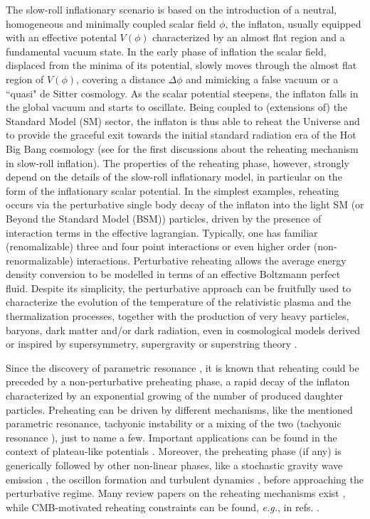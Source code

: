 \documentclass[%
aps,prd,nofootinbib,showkeys,a4paper,10pt
]{revtex4-2}
\begin{document}
The slow-roll inflationary scenario \cite{1,2,3,4,5,6} is based on the introduction of a neutral, homogeneous and minimally coupled scalar field $\phi$,
the inflaton, usually equipped with an effective potental $V(\phi)$ characterized by an almost flat region and a fundamental vacuum state.
In the early phase of inflation 
the scalar field, displaced from the minima of its potential, 
slowly moves through the almost flat region of $V(\phi)$, covering a distance $\Delta\phi$ \cite{7} and mimicking a false vacuum or a ``quasi" de Sitter cosmology. 
As the scalar potential steepens, the inflaton falls in the global vacuum and starts to oscillate.
Being coupled to (extensions of) the Standard Model (SM) sector,  the inflaton is thus able to reheat the Universe
and to provide the graceful exit towards the initial standard radiation era of the Hot Big Bang cosmology 
(see \cite{8,9,10,11} for the first discussions about the reheating mechanism in slow-roll inflation). 
The properties of the reheating phase, however, strongly depend on the details of the slow-roll inflationary model, in particular on the form of the inflationary scalar potential. 
In the simplest examples, reheating occurs via the  
perturbative single body decay of the inflaton into the light SM (or Beyond the Standard Model (BSM)) particles, 
driven by the presence of interaction terms in the effective lagrangian. Typically, one has  familiar (renomalizable) three and four point interactions
or even higher order (non-renormalizable) interactions.  
Perturbative reheating allows the average energy density conversion to be modelled in terms of an effective Boltzmann perfect fluid.  
Despite its simplicity, the perturbative approach can be fruitfully used to characterize the evolution of the temperature of the relativistic plasma 
and the thermalization processes, together with the production of very heavy
particles, baryons, dark matter and/or dark radiation, 
even in cosmological models derived or inspired  by supersymmetry, supergravity or superstring theory \cite{12,13,14,15,16,17,18,19,20,21,22,23,24,25,26,27,28,29}.

Since the discovery of parametric resonance \cite{30,31,32,33,34,35}, 
it is known that reheating could be preceded by a non-perturbative preheating phase,
a rapid decay of the inflaton characterized by an exponential growing of the number of produced daughter particles.  
Preheating can be driven by different mechanisms, 
like the mentioned parametric resonance, tachyonic instability \cite{36} or a mixing of the two (tachyonic resonance \cite{37}),  
just to name a few. 
Important applications can be found in the context of plateau-like potentials \cite{38}.
Moreover, the preheating phase (if any) is generically followed by other non-linear phases, 
like a stochastic gravity wave emission \cite{39}, the oscillon formation \cite{40} and turbulent dynamics \cite{41}, 
before approaching the perturbative regime.  
Many review papers on the reheating mechanisms exist \cite{42}, while CMB-motivated reheating constraints can be found,  
{\it e.g.}, in refs. \cite{43,44,45,46,47,48}.
\end{document}
